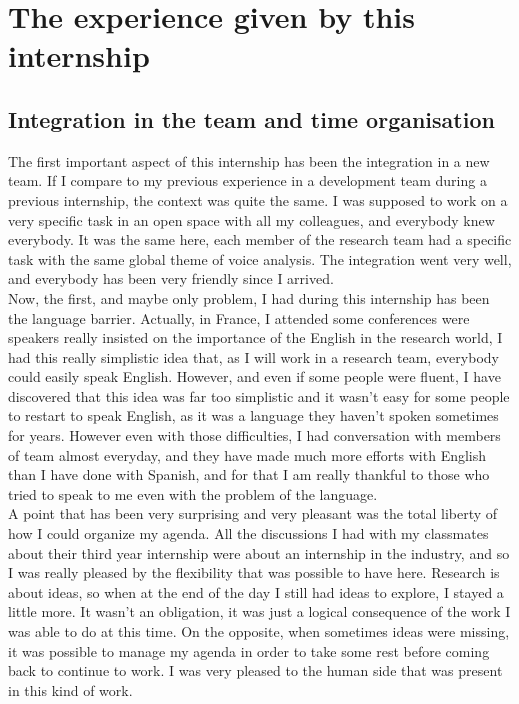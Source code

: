 \documentclass{report}
\begin{document}
	\chapter{The experience given by this internship}
	
	\section{Integration in the team and time organisation}
	
	The first important aspect of this internship has been the integration in a new team. If I compare to my previous experience in a development team during a previous internship, the context was quite the same. I was supposed to work on a very specific task in an open space with all my colleagues, and everybody knew everybody. It was the same here, each member of the research team had a specific task with the same global theme of voice analysis. The integration went very well, and everybody has been very friendly since I arrived.\\
	
	Now, the first, and maybe only problem, I had during this internship has been the language barrier. Actually, in France, I attended some conferences were speakers really insisted on the importance of the English in the research world, I had this really simplistic idea that, as I will work in a research team, everybody could easily speak English. However, and even if some people were fluent, I have discovered that this idea was far too simplistic and it wasn't easy for some people to restart to speak English, as it was a language they haven't spoken sometimes for years. However even with those difficulties, I had conversation with members of team almost everyday, and they have made much more efforts with English than I have done with Spanish, and for that I am really thankful to those who tried to speak to me even with the problem of the language.\\
	
	A point that has been very surprising and very pleasant was the total liberty of how I could organize my agenda. All the discussions I had with my classmates about their third year internship were about an internship in the industry, and so I was really pleased by the flexibility that was possible to have here. Research is about ideas, so when at the end of the day I still had ideas to explore, I stayed a little more. It wasn't an obligation, it was just a logical consequence of the work I was able to do at this time. On the opposite, when sometimes ideas were missing, it was possible to manage my agenda in order to take some rest before coming back to continue to work. I was very pleased to the human side that was present in this kind of work.
	
\end{document}
